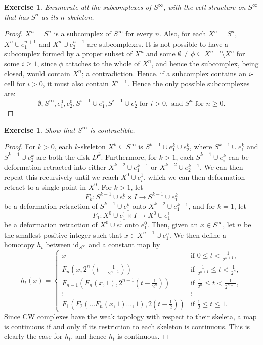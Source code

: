 \documentclass{article}
\newtheorem{exercise}[theorem]{Exercise}
\begin{document}
\begin{exercise}
Enumerate all the subcomplexes of $S^\infty$, with the cell structure on $S^\infty$ that has $S^n$ as its $n$-skeleton.
\end{exercise}
\begin{proof}
$X^n=S^n$ is a subcomplex of $S^\infty$ for every $n$. Also, for each $X^n=S^n$, $X^n\cup e_{1}^{n+1}$ and $X^n\cup e_{2}^{n+1}$ are subcomplexes. It is not possible to have a subcomplex formed by a proper subset of $X^n$ and some $\emptyset\neq\phi\subseteq X^{n+i}\setminus X^n$ for some $i\geq 1$, since $\phi$ attaches to the whole of $X^n$, and hence the subcomplex, being closed, would contain $X^n$; a contradiction. Hence, if a subcomplex contains an $i$-cell for $i>0$, it must also contain $X^{i-1}$. Hence the only possible subcomplexes are:
\[\emptyset, S^\infty, e_1^0,e_2^0, S^{i-1}\cup e_1^i,S^{i-1}\cup e_2^i \text{ for } i>0,\text{ and } S^n\text{ for }n\geq 0.\]
\end{proof}

\begin{exercise}
Show that $S^\infty$ is contractible.
\end{exercise}
\begin{proof}
For $k>0$, each $k$-skeleton $X^k\subseteq S^\infty$ is $S^{k-1}\cup e_1^k\cup e_2^k$, where $S^{k-1}\cup e_1^k$ and $S^{k-1}\cup e_2^k$ are both the disk $D^k$. Furthermore, for $k>1$, each $S^{k-1}\cup e_i^k$ can be deformation retracted into either $X^{k-2}\cup e_1^{k-1}$ or $X^{k-2}\cup e_2^{k-1}$. We can then repeat this recursively until we reach $X^0\cup e_i^{1}$, which we can then deformation retract to a single point in $X^0$. For $k>1$, let \[F_k:S^{k-1}\cup e_1^k\times I\to S^{k-1}\cup e_1^k\] be a deformation retraction of $S^{k-1}\cup e_1^k$ onto $X^{k-2}\cup e_1^{k-1}$, and for $k=1$, let \[F_1:X^0\cup e_1^1\times I\to X^0\cup e_1^1\] be a deformation retraction of $X^0\cup e_1^1$ onto $e_1^0$. Then, given an $x\in S^\infty$, let $n$ be the smallest positive integer such that $x\in X^{n-1}\cup e_1^n$. We then define a homotopy $h_t$ between $\text{id}_{S^\infty}$ and a constant map by\[h_t(x)=\begin{cases}
    x&\text{if }0\leq t<\frac{1}{2^{n+1}},\\F_n(x,2^n(t-\frac{1}{2^{n+1}}))&\text{if }\frac{1}{2^{n+1}}\leq t<\frac{1}{2^n},\\F_{n-1}(F_n(x,1),2^{n-1}(t-\frac{1}{2^{n}}))&\text{if }\frac{1}{2^n}\leq t<\frac{1}{2^{n-1}},\\\vdots&\vdots\\F_1(F_2(...F_n(x,1)...,1),2(t-\frac{1}{2}))&\text{if }\frac{1}{2}\leq t\leq 1.
\end{cases}\]Since CW complexes have the weak topology with respect to their skeleta, a map is continuous if and only if its restriction to each skeleton is continuous. This is clearly the case for $h_t$, and hence $h_t$ is continuous.
\end{proof}
\end{document}
